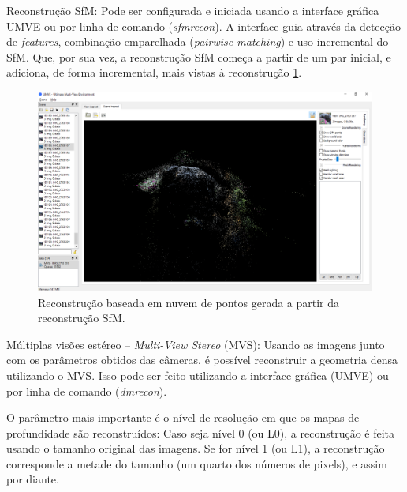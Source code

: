 Reconstrução SfM: Pode ser configurada e iniciada usando a interface gráfica UMVE ou por linha de comando ({\it sfmrecon}). A interface guia através da detecção de {\it features}, combinação emparelhada ({\it pairwise matching}) e uso incremental do SfM. Que, por sua vez, a reconstrução SfM começa a partir de um par inicial, e adiciona, de forma incremental, mais vistas à reconstrução \ref{fig:mvesfm}.

\begin{figure}[!h]
	\centering
	\includegraphics[width=0.5\linewidth]{figs/umve5sfm.png}
	\caption{%
	Reconstrução baseada em nuvem de pontos gerada a partir da reconstrução SfM.%
	}\label{fig:mvesfm}
\end{figure}


%

Múltiplas visões estéreo -- {\it Multi-View Stereo} (MVS): Usando as imagens junto com os parâmetros obtidos das câmeras, é possível reconstruir a geometria densa utilizando o MVS. Isso pode ser feito utilizando a interface gráfica (UMVE) ou por linha de comando ({\it dmrecon}).

O parâmetro mais importante é o nível de resolução em que os mapas de profundidade são reconstruídos: Caso seja nível 0 (ou L0), a reconstrução é feita usando o tamanho original das imagens. Se for nível 1 (ou L1), a reconstrução corresponde a metade do tamanho (um quarto dos números de pixels), e assim por diante.

